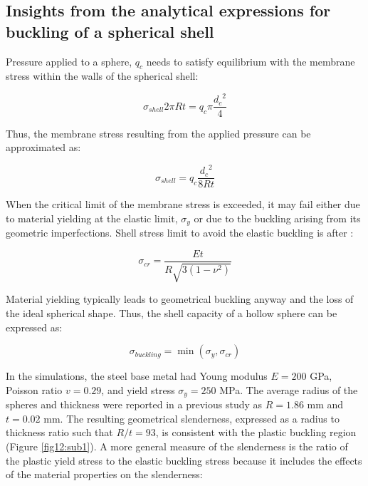 \documentclass[review]{elsarticle}
\begin{document}
\subsection{Insights from the analytical expressions for buckling of a spherical shell}

Pressure applied to a sphere, $q_c$ needs to satisfy equilibrium with the membrane stress within the walls of the spherical shell:

\begin{equation}\label{Eq1}
\sigma_{shell}2\pi Rt=q_c\pi \frac{{d_c}^{2}}{4}
\end{equation}

Thus, the membrane stress resulting from the applied pressure can be approximated as:

\begin{equation}\label{Eq2}
\sigma_{shell}=q_c\frac{{d_c}^{2}}{8Rt}
\end{equation}

When the critical limit of the membrane stress is exceeded, it may fail either due to material yielding at the elastic limit, $\sigma_y$ or due to the buckling arising from its geometric imperfections. Shell stress limit to avoid the elastic buckling is after \cite{TimGer2009}:

\begin{equation}\label{Eq3}
\sigma_{cr}=\frac{Et}{R\sqrt{3(1-\nu^2)}}
\end{equation}

Material yielding typically leads to geometrical buckling anyway and the loss of the ideal spherical shape. Thus, the shell capacity of a hollow sphere can be expressed as:

\begin{equation}\label{Eq4}
\sigma_{buckling}=\min(\sigma_y,\sigma_{cr})
\end{equation}


In the simulations, the steel base metal had Young modulus $E=200$ GPa, Poisson ratio $v=0.29$, and yield stress $\sigma_y=250$ MPa. The average radius of the spheres and thickness were reported in a previous study \cite{Szyniszewskietal2014} as $R = 1.86$ mm and $t = 0.02$ mm. The resulting geometrical slenderness, expressed as a radius to thickness ratio such that $R/t = 93$, is consistent with the plastic buckling region (Figure \ref{fig12:sub1}). A more general measure of the slenderness is the ratio of the plastic yield stress to the elastic buckling stress because it includes the effects of the material properties on the slenderness:
\end{document}

